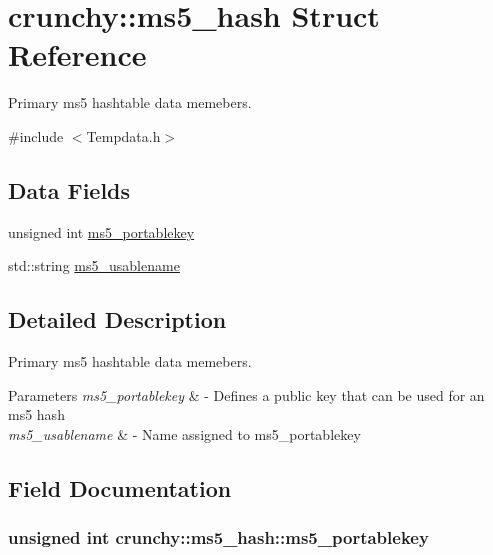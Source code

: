 \hypertarget{structcrunchy_1_1ms5__hash}{}\section{crunchy\+:\+:ms5\+\_\+hash Struct Reference}
\label{structcrunchy_1_1ms5__hash}


Primary ms5 hashtable data memebers.  




{\ttfamily \#include $<$Tempdata.\+h$>$}

\subsection*{Data Fields}
\begin{DoxyCompactItemize}
\item 
unsigned int \hyperlink{structcrunchy_1_1ms5__hash_ac9cfaf8430a5d1da38684a28314b11e2}{ms5\+\_\+portablekey}
\item 
std\+::string \hyperlink{structcrunchy_1_1ms5__hash_a375a1251bbe67bb9928f1b4154154ef0}{ms5\+\_\+usablename}
\end{DoxyCompactItemize}


\subsection{Detailed Description}
Primary ms5 hashtable data memebers. 


\begin{DoxyParams}{Parameters}
{\em ms5\+\_\+portablekey} & -\/ Defines a public key that can be used for an ms5 hash \\
\hline
{\em ms5\+\_\+usablename} & -\/ Name assigned to ms5\+\_\+portablekey \\
\hline
\end{DoxyParams}


\subsection{Field Documentation}
\hypertarget{structcrunchy_1_1ms5__hash_ac9cfaf8430a5d1da38684a28314b11e2}{}
\subsubsection[{ms5\+\_\+portablekey}]{\setlength{\rightskip}{0pt plus 5cm}unsigned int crunchy\+::ms5\+\_\+hash\+::ms5\+\_\+portablekey}\label{structcrunchy_1_1ms5__hash_ac9cfaf8430a5d1da38684a28314b11e2}
\hypertarget{structcrunchy_1_1ms5__hash_a375a1251bbe67bb9928f1b4154154ef0}{}
